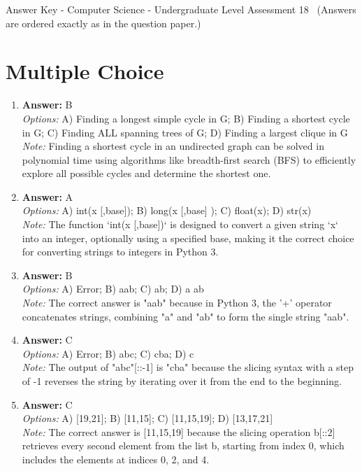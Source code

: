 \documentclass[12pt]{article}
\begin{document}
\begin{center}
Answer Key - Computer Science - Undergraduate Level Assessment 18 \
\small (Answers are ordered exactly as in the question paper.)
\end{center}

\section*{Multiple Choice}
\begin{enumerate}[label=\arabic*.]
\item \textbf{Answer:} B
\\ \textit{Options:} A) Finding a longest simple cycle in G; B) Finding a shortest cycle in G; C) Finding ALL spanning trees of G; D) Finding a largest clique in G
\\ \textit{Note:} Finding a shortest cycle in an undirected graph can be solved in polynomial time using algorithms like breadth-first search (BFS) to efficiently explore all possible cycles and determine the shortest one.
\item \textbf{Answer:} A
\\ \textit{Options:} A) int(x [,base]); B) long(x [,base] ); C) float(x); D) str(x)
\\ \textit{Note:} The function `int(x [,base])` is designed to convert a given string `x` into an integer, optionally using a specified base, making it the correct choice for converting strings to integers in Python 3.
\item \textbf{Answer:} B
\\ \textit{Options:} A) Error; B) aab; C) ab; D) a ab
\\ \textit{Note:} The correct answer is "aab" because in Python 3, the '+' operator concatenates strings, combining "a" and "ab" to form the single string "aab".
\item \textbf{Answer:} C
\\ \textit{Options:} A) Error; B) abc; C) cba; D) c
\\ \textit{Note:} The output of "abc"[::-1] is "cba" because the slicing syntax with a step of -1 reverses the string by iterating over it from the end to the beginning.
\item \textbf{Answer:} C
\\ \textit{Options:} A) [19,21]; B) [11,15]; C) [11,15,19]; D) [13,17,21]
\\ \textit{Note:} The correct answer is [11,15,19] because the slicing operation b[::2] retrieves every second element from the list b, starting from index 0, which includes the elements at indices 0, 2, and 4.
\end{enumerate}
\end{document}
